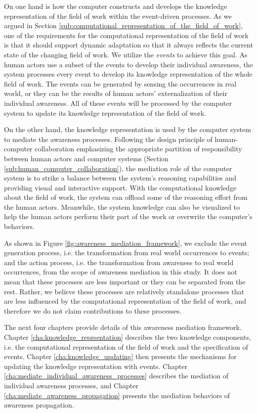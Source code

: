 On one hand is how the computer constructs and develops the knowledge representation of the field of work within the event-driven processes. As we argued in Section \ref{sub:computational_representation_of_the_field_of_work}, one of the requirements for the computational representation of the field of work is that it should support dynamic adaptation so that it always reflects the current state of the changing field of work. We utilize the \emph{events} to achieve this goal. As human actors use a subset of the events to develop their individual awareness, the system processes every event to develop its knowledge representation of the whole field of work. The events can be generated by sensing the occurrences in real world, or they can be the results of human actors' externalization of their individual awareness. All of these events will be processed by the computer system to update its knowledge representation of the field of work.

On the other hand, the knowledge representation is used by the computer system to mediate the awareness processes. Following the design principle of human-computer collaboration emphasizing the appropriate partition of responsibility between human actors and computer systems (Section \ref{sub:human_computer_collaboration}), the mediation role of the computer system is to strike a balance between the system's reasoning capabilities and providing visual and interactive support. With the computational knowledge about the field of work, the system can offload some of the reasoning effort from the human actors. Meanwhile, the system knowledge can also be visualized to help the human actors perform their part of the work or overwrite the computer's behaviors. 

As shown in Figure \ref{fig:awareness_mediation_framework}, we exclude the event generation process, i.e. the transformation from real world occurrences to events; and the action process, i.e. the transformation from awareness to real world occurrences, from the scope of awareness mediation in this study. It does not mean that these processes are less important or they can be separated from the rest. Rather, we believe these processes are relatively standalone processes that are less influenced by the computational representation of the field of work, and therefore we do not claim contributions to these processes. 

The next four chapters provide details of this awareness mediation framework. Chapter \ref{cha:knowledge_reprsentation} describes the two knowledge components, i.e. the computational representation of the field of work and the specification of events. Chapter \ref{cha:knowledge_updating} then presents the mechanisms for updating the knowledge representation with events. Chapter \ref{cha:mediate_individual_awareness_processes} describes the mediation of individual awareness processes, and Chapter \ref{cha:mediate_awareness_propagation} presents the mediation behaviors of awareness propagation.





 

